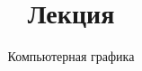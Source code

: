 \documentclass[10pt]{beamer}
\title{Лекция \lecdni \\ \lecturename}
\subtitle{Компьютерная графика}
\begin{document}
 		 
	

    \QRFRAME
	
	\begin{frame}
		\maketitle
	\end{frame}
	
	
\end{document}
